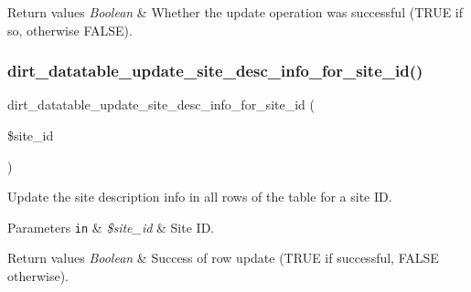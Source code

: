 \begin{DoxyRetVals}{Return values}
{\em Boolean} & Whether the update operation was successful (T\+R\+UE if so, otherwise F\+A\+L\+SE). \\
\hline
\end{DoxyRetVals}
\mbox{\label{dirt__datatable_8search__table__db__ops_8inc_adc8fd725ebd50be533410926026a8f24}} 
\subsubsection{\texorpdfstring{dirt\+\_\+datatable\+\_\+update\+\_\+site\+\_\+desc\+\_\+info\+\_\+for\+\_\+site\+\_\+id()}{dirt\_datatable\_update\_site\_desc\_info\_for\_site\_id()}}
{\footnotesize\ttfamily dirt\+\_\+datatable\+\_\+update\+\_\+site\+\_\+desc\+\_\+info\+\_\+for\+\_\+site\+\_\+id (\begin{DoxyParamCaption}\item[{}]{\$site\+\_\+id }\end{DoxyParamCaption})}

Update the site description info in all rows of the table for a site ID.


\begin{DoxyParams}[1]{Parameters}
\mbox{\tt in}  & {\em \$site\+\_\+id} & Site ID.\\
\hline
\end{DoxyParams}

\begin{DoxyRetVals}{Return values}
{\em Boolean} & Success of row update (T\+R\+UE if successful, F\+A\+L\+SE otherwise). \\
\hline
\end{DoxyRetVals}
